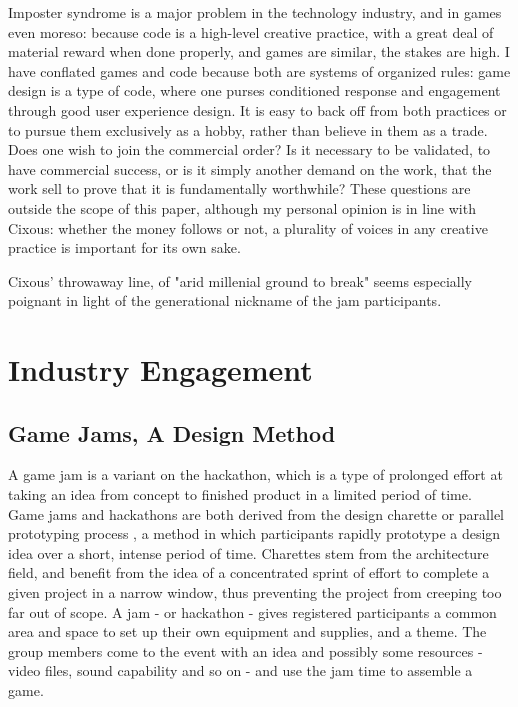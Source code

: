 Imposter syndrome is a major problem in the technology industry, and in games even moreso: because code is a high-level creative practice, with a great deal of material reward when done properly, and games are similar, the stakes are high. I have conflated games and code because both are systems of organized rules: game design is a type of code, where one purses conditioned response and engagement through good user experience design. It is easy to back off from both practices or to pursue them exclusively as a hobby, rather than believe in them as a trade. Does one wish to join the commercial order? Is it necessary to be validated, to have commercial success, or is it simply another demand on the work, that the work sell to prove that it is fundamentally worthwhile? These questions are outside the scope of this paper, although my personal opinion is in line with Cixous: whether the money follows or not, a plurality of voices in any creative practice is important for its own sake.

Cixous' throwaway line, of "arid millenial ground to break" seems especially poignant in light of the generational nickname of the jam participants. 


\section{Industry Engagement}
\subsection{Game Jams, A Design Method}
A game jam is a variant on the hackathon, which is a type of prolonged effort at taking an idea from concept to finished product in a limited period of time. Game jams and hackathons are both derived from the design charette or parallel prototyping process \parencite{martin}, a method in which participants rapidly prototype a design idea over a short, intense period of time. Charettes stem from the architecture field, and benefit from the idea of a concentrated sprint of effort to complete a given project in a narrow window, thus preventing the project from creeping too far out of scope. A jam - or hackathon - gives registered participants a common area and space to set up their own equipment and supplies, and a theme. The group members come to the event with an idea and possibly some resources - video files, sound capability and so on - and use the jam time to assemble a game.

